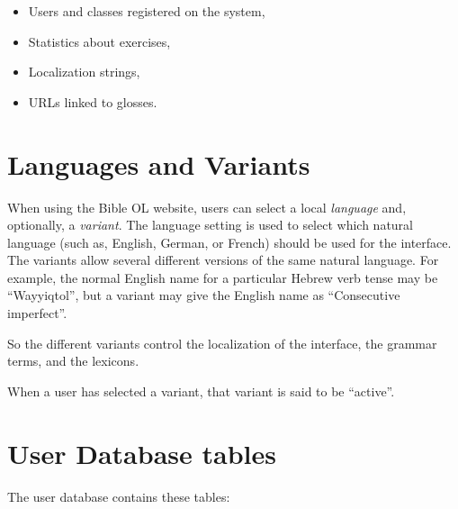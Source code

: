 \documentclass[11pt,oneside,a4paper]{memoir}
\begin{document}
\begin{itemize}
\item Users and classes registered on the system,
\item Statistics about exercises,
\item Localization strings,
\item URLs linked to glosses.
\end{itemize}


\section{Languages and Variants}\label{sec-variants}

When using the Bible OL website, users can select a local \emph{language} and, optionally, a
\emph{variant}. The language setting is used to select which natural language (such as, English,
German, or French) should be used for the interface. The variants allow several different versions of
the same natural language. For example, the normal English name for a particular Hebrew verb
tense may be ``Wayyiqtol'', but a variant may give the English name as ``Consecutive imperfect''.

So the different variants control the localization of the interface, the grammar terms, and the
lexicons.

When a user has selected a variant, that variant is said to be ``active''.

\section{User Database tables}


The user database contains these tables:
\end{document}
